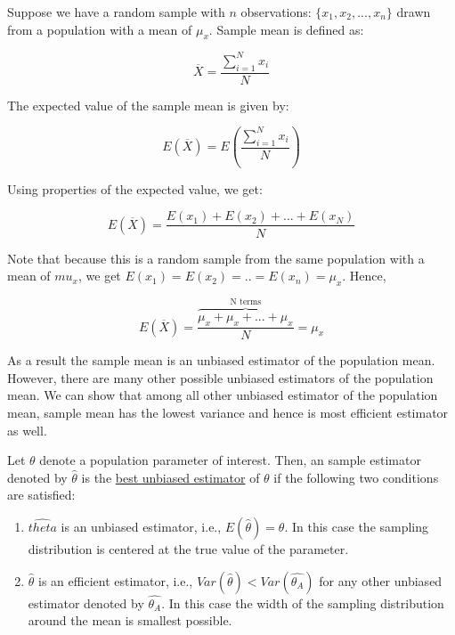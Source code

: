 \documentclass[]{book}
\theoremstyle{definition}
\theoremstyle{definition}
\theoremstyle{definition}
\theoremstyle{remark}
\let\BeginKnitrBlock\begin \let\EndKnitrBlock\end
\begin{document}
\BeginKnitrBlock{example}
\protect\hypertarget{exm:unnamed-chunk-57}{}{\label{exm:unnamed-chunk-57} }Suppose we have a random sample with \(n\) observations: \(\{x_1,x_2,...,x_n\}\) drawn from a population with a mean of \(\mu_x\). Sample mean is defined as:

\[\overline{X}=\frac{\sum_{i=1}^N x_i}{N}\]

The expected value of the sample mean is given by:

\[E(\overline{X})=E\left(\frac{\sum_{i=1}^N x_i}{N}\right)\]

Using properties of the expected value, we get:

\[E(\overline{X})=\frac{E(x_1)+E(x_2)+...+ E(x_N)}{N}\]

Note that because this is a random sample from the same population with a mean of \(mu_x\), we get \(E(x_1)=E(x_2)=..=E(x_n)=\mu_x\). Hence,

\[E(\overline{X})=\frac{\overbrace{\mu_x+\mu_x+...+\mu_x}^{\text{N terms}} }{N}=\mu_x\]

As a result the sample mean is an unbiased estimator of the population mean. However, there are many other possible unbiased estimators of the population mean. We can show that among all other unbiased estimator of the population mean, sample mean has the lowest variance and hence is most efficient estimator as well.
\EndKnitrBlock{example}

\BeginKnitrBlock{definition}[Best Unbiased Estimator (BUE)]
\protect\hypertarget{def:unnamed-chunk-58}{}{\label{def:unnamed-chunk-58} {} }Let \(\theta\) denote a population parameter of interest. Then, an sample estimator denoted by \(\hat{\theta}\) is the \underline{best unbiased estimator} of \(\theta\) if the following two conditions are satisfied:

\begin{enumerate}
\def\labelenumi{\arabic{enumi}.}
\item
  \(\hat{theta}\) is an unbiased estimator, i.e., \(E(\hat{\theta})=\theta\). In this case the sampling distribution is centered at the true value of the parameter.
\item
  \(\hat{\theta}\) is an efficient estimator, i.e., \(Var(\hat{\theta})< Var(\hat{\theta_A})\) for any other unbiased estimator denoted by \(\hat{\theta_A}\). In this case the width of the sampling distribution around the mean is smallest possible.
\end{enumerate}
\EndKnitrBlock{definition}
\end{document}
